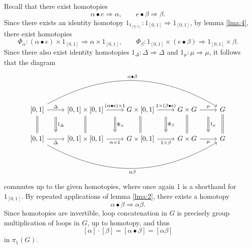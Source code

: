\documentclass[11pt, letterpaper]{article}
\begin{document}
Recall that there exist homotopies
\[
	\alpha \bullet e\Rightarrow \alpha ,\qquad e\bullet \beta \Rightarrow \beta 
.\]
Since there exists an identity homotopy $1_{1_{[0,1]} }  : 1_{[0,1]}  \Rightarrow 1_{[0,1]} $, by lemma \ref{lma:4}, there exist homotopies
\[
	\Phi_\alpha  : (\alpha \bullet e)\times 1_{\left[ 0,1 \right] } \Rightarrow \alpha \times 1_{\left[ 0,1 \right] } ,\qquad \Phi _\beta : 1_{[0,1]} \times \left( e\bullet \beta  \right)\Rightarrow 1_{[0,1]} \times \beta 
.\]
Since there also exist identity homotopies $1_\Delta : \Delta  \Rightarrow \Delta $ and $1_\mu : \mu  \Rightarrow \mu $, it follows that the diagram
\[\begin{tikzcd}[row sep = 2.5em, column sep = 2.5em]
	\left[ 0,1 \right] \ar[" \alpha \bullet \beta  ", bend left, rrrr] \ar[equals, d] \ar[" \Delta  "{name=d1}, r]  & \left[ 0,1 \right] \times \left[ 0,1 \right] \ar[" (\alpha \bullet e)\times 1 "{name=a1}, r] \ar[equals, d]  & G\times \left[ 0,1 \right] \ar[" 1\times (\beta \bullet e) "{name=b1}, r] \ar[equals, d]  & G\times G\ar[" \mu  "{name=m1}, r] \ar[equals, d]  & G\ar[equals, d] \\
	\left[ 0,1 \right] \ar[" \Delta  "'{name=d2}, r] \ar[" \alpha \beta  "', bend right, rrrr]  & \left[ 0,1 \right] \times \left[ 0,1 \right] \ar[" \alpha \times 1 "'{name=a2}, r]  & G\times \left[ 0,1 \right] \ar[" 1\times \beta  "'{name=b2}, r]  & G\times G\ar[" \mu  "'{name=m2}, r]  & G
	\arrow[from=d1, to=d2, " 1_{\Delta } ", Rightarrow, shorten=10pt]
	\arrow[from=a1, to=a2, " \Phi_\alpha  ", Rightarrow, shorten=10pt]
	\arrow[from=b1, to=b2, " \Phi_\beta  ", Rightarrow, shorten=10pt]
	\arrow[from=m1, to=m2, " 1_{\mu } ", Rightarrow, shorten=10pt]
\end{tikzcd}\]
commutes up to the given homotopies, where once again 1 is a shorthand for $1_{\left[ 0,1 \right] } $. By repeated applications of lemma \ref{lma:2}, there exists a homotopy
\[
	\alpha \bullet \beta \Rightarrow \alpha \beta 
.\]
Since homotopies are invertible, loop concatenation in $G$ is precisely group multiplication of loops in $G$, up to homotopy, and thus
\[
	[\alpha]\cdot [\beta ]=[\alpha \bullet \beta ]=[\alpha \beta ]
\]
in $\pi _1(G)$.
\end{document}
